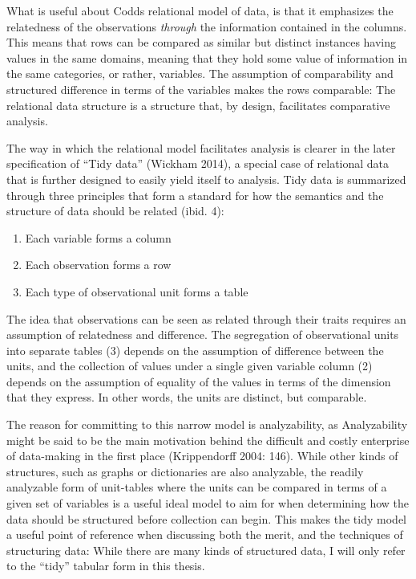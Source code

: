 \documentclass[12pt,twoside]{reedthesis}
\providecommand{\tightlist}{%
  \setlength{\itemsep}{0pt}\setlength{\parskip}{0pt}}
\begin{document}
What is useful about Codds relational model of data, is that it
emphasizes the relatedness of the observations \emph{through} the
information contained in the columns. This means that rows can be
compared as similar but distinct instances having values in the same
domains, meaning that they hold some value of information in the same
categories, or rather, variables. The assumption of comparability and
structured difference in terms of the variables makes the rows
comparable: The relational data structure is a structure that, by
design, facilitates comparative analysis.

The way in which the relational model facilitates analysis is clearer in
the later specification of ``Tidy data'' (Wickham 2014), a special case
of relational data that is further designed to easily yield itself to
analysis. Tidy data is summarized through three principles that form a
standard for how the semantics and the structure of data should be
related (ibid. 4):
\begin{enumerate}
\def\labelenumi{\arabic{enumi}.}
\tightlist
\item
  Each variable forms a column
\item
  Each observation forms a row
\item
  Each type of observational unit forms a table
\end{enumerate}
The idea that observations can be seen as related through their traits
requires an assumption of relatedness and difference. The segregation of
observational units into separate tables (3) depends on the assumption
of difference between the units, and the collection of values under a
single given variable column (2) depends on the assumption of equality
of the values in terms of the dimension that they express. In other
words, the units are distinct, but comparable.

The reason for committing to this narrow model is analyzability, as
Analyzability might be said to be the main motivation behind the
difficult and costly enterprise of data-making in the first place
(Krippendorff 2004: 146). While other kinds of structures, such as
graphs or dictionaries are also analyzable, the readily analyzable form
of unit-tables where the units can be compared in terms of a given set
of variables is a useful ideal model to aim for when determining how the
data should be structured before collection can begin. This makes the
tidy model a useful point of reference when discussing both the merit,
and the techniques of structuring data: While there are many kinds of
structured data, I will only refer to the ``tidy'' tabular form in this
thesis.
\end{document}
